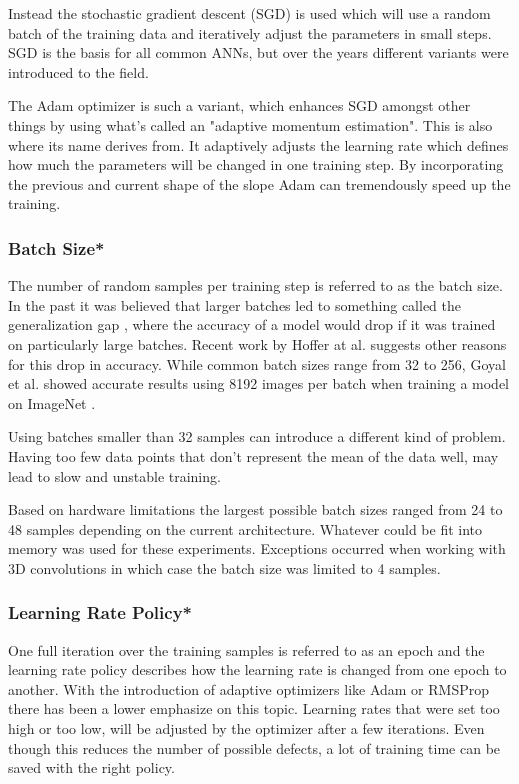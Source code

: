Instead the stochastic gradient descent (SGD) is used which will use a random batch of the training data and iteratively adjust the parameters in small steps. SGD is the basis for all common ANNs, but over the years different variants were introduced to the field.

The Adam optimizer is such a variant, which enhances SGD amongst other things by using what's called an "adaptive momentum estimation". This is also where its name derives from. It adaptively adjusts the learning rate which defines how much the parameters will be changed in one training step. By incorporating the previous and current shape of the slope Adam can tremendously speed up the training.

\subsubsection{Batch Size*}

The number of random samples per training step is referred to as the batch size. In the past it was believed that larger batches led to something called the generalization gap \cite{Keskar2016}, where the accuracy of a model would drop if it was trained on particularly large batches. Recent work by Hoffer at al. \cite{Hoffer2017} suggests other reasons for this drop in accuracy. While common batch sizes range from 32 to 256, Goyal et al. showed accurate results using 8192 images per batch when training a model on ImageNet \cite{Goyal2017}.

Using batches smaller than 32 samples can introduce a different kind of problem. Having too few data points that don't represent the mean of the data well, may lead to slow and unstable training.

Based on hardware limitations the largest possible batch sizes ranged from 24 to 48 samples depending on the current architecture. Whatever could be fit into memory was used for these experiments. Exceptions occurred when working with 3D convolutions in which case the batch size was limited to 4 samples.

\subsubsection{Learning Rate Policy*}

One full iteration over the training samples is referred to as an epoch and the learning rate policy describes how the learning rate is changed from one epoch to another. With the introduction of adaptive optimizers like Adam or RMSProp there has been a lower emphasize on this topic. Learning rates that were set too high or too low, will be adjusted by the optimizer after a few iterations. Even though this reduces the number of possible defects, a lot of training time can be saved with the right policy.

